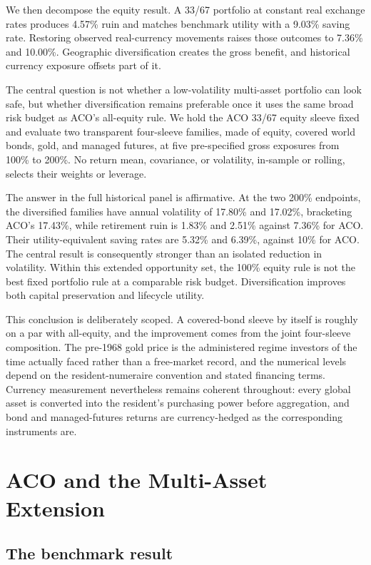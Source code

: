 \documentclass[11pt]{article}
\begin{document}
We then decompose the equity result. A 33/67 portfolio at constant real
exchange rates produces 4.57\% ruin and matches benchmark utility with a
9.03\% saving rate. Restoring observed real-currency movements raises those
outcomes to 7.36\% and 10.00\%. Geographic diversification creates the gross
benefit, and historical currency exposure offsets part of it.

The central question is not whether a low-volatility multi-asset portfolio can
look safe, but whether diversification remains preferable once it uses the same
broad risk budget as ACO's all-equity rule. We hold the ACO 33/67 equity sleeve
fixed and evaluate two transparent four-sleeve families, made of equity, covered
world bonds, gold, and managed futures, at five pre-specified gross exposures
from 100\% to 200\%. No return mean, covariance, or volatility, in-sample or
rolling, selects their weights or leverage.

The answer in the full historical panel is affirmative. At the two 200\%
endpoints, the diversified families have annual volatility of 17.80\% and
17.02\%, bracketing ACO's 17.43\%, while retirement ruin is 1.83\% and 2.51\%
against 7.36\% for ACO. Their utility-equivalent saving rates are 5.32\% and
6.39\%, against 10\% for ACO. The central result is consequently stronger than
an isolated reduction in volatility. Within this extended opportunity set, the
100\% equity rule is not the best fixed portfolio rule at a comparable risk
budget. Diversification improves both capital preservation and lifecycle
utility.

This conclusion is deliberately scoped. A covered-bond sleeve by itself is
roughly on a par with all-equity, and the improvement comes from the joint
four-sleeve composition. The
pre-1968 gold price is the administered regime investors of the time actually
faced rather than a free-market record, and the numerical levels
depend on the resident-numeraire convention and stated financing terms. Currency
measurement nevertheless remains coherent throughout: every global asset is
converted into the resident's purchasing power before aggregation, and bond and
managed-futures returns are currency-hedged as the corresponding instruments
are.


\section{ACO and the Multi-Asset Extension}

\subsection{The benchmark result}
\label{sec:benchmark}
\end{document}
